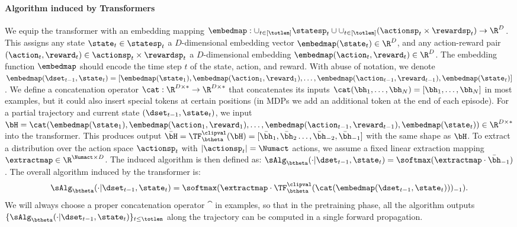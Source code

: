 \documentclass[10pt]{article}
\begin{document}
\paragraph{Algorithm induced by Transformers} We equip the transformer with an embedding mapping $\embedmap: \cup_{t \in [\totlen]} \statesp_t \cup \cup_{t \in [\totlen]} (\actionsp_t \times \rewardsp_t) \to \R^D$.  This assigns any state $\state_t \in \statesp_t$ a $D$-dimensional embedding vector $\embedmap(\state_t) \in \R^D$, and any action-reward pair $(\action_t, \reward_t) \in \actionsp_t \times \rewardsp_t$ a $D$-dimensional embedding $\embedmap(\action_t, \reward_t) \in \R^D$. The embedding function $\embedmap$ should encode the time step $t$ of the state, action, and reward. With abuse of notation, we denote $\embedmap(\dset_{t-1}, \state_t) = [\embedmap(\state_1), \embedmap(\action_1, \reward_1), \ldots, \embedmap(\action_{t-1}, \reward_{t-1}), \embedmap(\state_t)]$. We define a concatenation operator $\cat: \R^{D \times *} \to \R^{D \times *}$ that concatenates its inputs $\cat(\bh_1, \ldots, \bh_N) = [\bh_1, \ldots, \bh_N]$ in most examples, but it could also insert special tokens at certain positions (in MDPs we add an additional token at the end of each episode). For a partial trajectory and current state $(\dset_{t-1}, \state_t)$, we input $\bH = \cat(\embedmap(\state_1), \embedmap(\action_1, \reward_1), \ldots, \embedmap(\action_{t-1}, \reward_{t-1}), \embedmap(\state_t)) \in \R^{D \times *}$ into the transformer. This produces output $\bar{\bH} = \TF_{\btheta}^{\clipval}(\bH) = [\bar{\bh}_1, \bar{\bh}_2 \ldots, \bar{\bh}_{-2},\bar{\bh}_{-1}]$ with the same shape as $\bH$. To extract a distribution over the action space $\actionsp_t$ with $| \actionsp_t | = \Numact$ actions, we assume a fixed linear extraction mapping $\extractmap \in \R^{\Numact \times D}$. The induced algorithm is then defined as: $\sAlg_\btheta(\cdot | \dset_{t-1}, \state_t) = \softmax(\extractmap \cdot \bar{\bh}_{-1})$. The overall algorithm induced by the transformer is:
\begin{equation}\label{eqn:transformer-algorithm}
\sAlg_\btheta(\cdot | \dset_{t-1}, \state_t) = \softmax ( {\extractmap} \cdot {\TF_\btheta^{\clipval}} ( {\cat}( {\embedmap} ( \dset_{t-1}, \state_t)))_{-1}).
\end{equation}
We will always choose a proper concatenation operator $\cat$ in examples, so that in the pretraining phase, all the algorithm outputs $\{ \sAlg_\btheta(\cdot | \dset_{t-1}, \state_t) \}_{t \le \totlen}$ along the trajectory can be computed in a single forward propagation.
\end{document}
